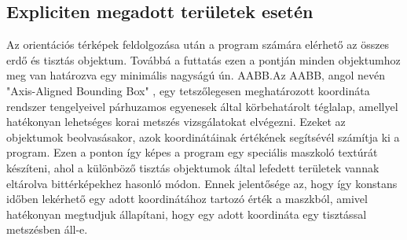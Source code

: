 \subsection{Expliciten megadott területek esetén}

Az orientációs térképek feldolgozása után a program számára elérhető az összes erdő és tisztás objektum. Továbbá a futtatás ezen a pontján minden objektumhoz meg van határozva egy minimális nagyságú ún. AABB.\newline Az AABB, angol nevén "Axis-Aligned Bounding Box" , egy tetszőlegesen meghatározott koordináta rendszer tengelyeivel párhuzamos egyenesek által körbehatárolt téglalap, amellyel hatékonyan lehetséges korai metszés vizsgálatokat elvégezni. Ezeket az objektumok beolvasásakor, azok koordinátáinak értékének segítsévél számítja ki a program.
Ezen a ponton így képes a program egy speciális maszkoló textúrát készíteni, ahol a különböző tisztás objektumok által lefedett területek vannak eltárolva bittérképekhez hasonló módon. Ennek jelentősége az, hogy így konstans időben lekérhető egy adott koordinátához tartozó érték a maszkból, amivel hatékonyan megtudjuk állapítani, hogy egy adott koordináta egy tisztással metszésben áll-e.



